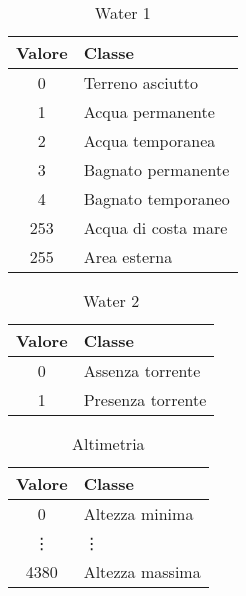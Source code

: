 \documentclass[draft]{article}
\begin{document}
\begin{table}
\centering
\begin{tabular}{|c|l|}
\hline
\textbf{Valore} & \textbf{Classe}\\
\hline
0 & Terreno asciutto\\
1 & Acqua permanente\\
2 & Acqua temporanea\\
3 & Bagnato permanente\\
4 & Bagnato temporaneo\\
253 & Acqua di costa mare\\
255 & Area esterna\\
\hline
\end{tabular}
\caption{Water 1}
\label{tab:water1}
\end{table}

\begin{table}
\centering
\begin{tabular}{|c|l|}
\hline
\textbf{Valore} & \textbf{Classe}\\
\hline
0 & Assenza torrente\\
1 & Presenza torrente\\
\hline
\end{tabular}
\caption{Water 2}
\label{tab:water2}
\end{table}

\begin{table}
\centering
\begin{tabular}{|c|l|}
\hline
\textbf{Valore} & \textbf{Classe}\\
\hline
0 & Altezza minima\\
\vdots & \vdots\\
4380 & Altezza massima\\
\hline
\end{tabular}
\caption{Altimetria}
\label{tab:altimetry}
\end{table}



\end{document}
